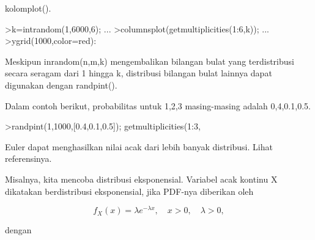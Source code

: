\documentclass[a4paper,10pt]{article}
\begin{document}
\begin{eulernotebook}
\begin{eulercomment}
\begin{eulercomment}
\begin{eulercomment}
\begin{eulercomment}
\begin{eulercomment}
\begin{eulercomment}
\begin{eulercomment}
\begin{eulercomment}
\begin{eulercomment}
\begin{eulercomment}
\begin{eulercomment}
\begin{eulercomment}
\begin{eulercomment}
\begin{eulercomment}
\begin{eulercomment}
\begin{eulercomment}
\begin{eulercomment}
\begin{eulercomment}
\begin{eulercomment}
\begin{eulercomment}
\begin{eulercomment}
\begin{eulercomment}
\begin{eulercomment}
\begin{eulercomment}
\begin{eulercomment}
\begin{eulercomment}
\begin{eulercomment}
\begin{eulercomment}
\begin{eulercomment}
\begin{eulercomment}
\begin{eulercomment}
\begin{eulercomment}
\begin{eulercomment}
\begin{eulercomment}
\begin{eulercomment}
\begin{eulercomment}
\begin{eulercomment}
\begin{eulercomment}
\begin{eulercomment}
\begin{eulercomment}
\begin{eulercomment}
\begin{eulercomment}
\begin{eulercomment}
\begin{eulercomment}
\begin{eulercomment}
\begin{eulercomment}
\begin{eulercomment}
\begin{eulercomment}
\begin{eulercomment}
\begin{eulercomment}
\begin{eulercomment}
\begin{eulercomment}
\begin{eulercomment}
\begin{eulercomment}
\begin{eulercomment}
\begin{eulercomment}
\begin{eulercomment}
\begin{eulercomment}
\begin{eulercomment}
\begin{eulercomment}
\begin{eulercomment}
\begin{eulercomment}
\begin{eulercomment}
\begin{eulercomment}
\begin{eulercomment}
\begin{eulercomment}
\begin{eulercomment}
kolomplot().
\end{eulercomment}
\begin{eulerprompt}
>k=intrandom(1,6000,6);  ...
>columnsplot(getmultiplicities(1:6,k));  ...
>ygrid(1000,color=red):
\end{eulerprompt}
\begin{eulercomment}
Meskipun inrandom(n,m,k) mengembalikan bilangan bulat yang
terdistribusi secara seragam dari 1 hingga k, distribusi bilangan
bulat lainnya dapat digunakan dengan randpint().

Dalam contoh berikut, probabilitas untuk 1,2,3 masing-masing adalah
0,4,0.1,0.5.
\end{eulercomment}
\begin{eulerprompt}
>randpint(1,1000,[0.4,0.1,0.5]); getmultiplicities(1:3,%
\end{eulerprompt}
\begin{euleroutput}
  [395,  106,  499]
\end{euleroutput}
\begin{eulercomment}
Euler dapat menghasilkan nilai acak dari lebih banyak distribusi.
Lihat referensinya.

Misalnya, kita mencoba distribusi eksponensial. Variabel acak kontinu
X dikatakan berdistribusi eksponensial, jika PDF-nya diberikan oleh\\
\end{eulercomment}
\begin{eulerformula}
\[
f_X(x)=\lambda e^{-\lambda x},\quad x>0,\quad \lambda>0,
\]
\end{eulerformula}
\begin{eulercomment}
dengan 
\end{eulercomment}
\end{eulercomment}
\end{eulercomment}
\end{eulercomment}
\end{eulercomment}
\end{eulercomment}
\end{eulercomment}
\end{eulercomment}
\end{eulercomment}
\end{eulercomment}
\end{eulercomment}
\end{eulercomment}
\end{eulercomment}
\end{eulercomment}
\end{eulercomment}
\end{eulercomment}
\end{eulercomment}
\end{eulercomment}
\end{eulercomment}
\end{eulercomment}
\end{eulercomment}
\end{eulercomment}
\end{eulercomment}
\end{eulercomment}
\end{eulercomment}
\end{eulercomment}
\end{eulercomment}
\end{eulercomment}
\end{eulercomment}
\end{eulercomment}
\end{eulercomment}
\end{eulercomment}
\end{eulercomment}
\end{eulercomment}
\end{eulercomment}
\end{eulercomment}
\end{eulercomment}
\end{eulercomment}
\end{eulercomment}
\end{eulercomment}
\end{eulercomment}
\end{eulercomment}
\end{eulercomment}
\end{eulercomment}
\end{eulercomment}
\end{eulercomment}
\end{eulercomment}
\end{eulercomment}
\end{eulercomment}
\end{eulercomment}
\end{eulercomment}
\end{eulercomment}
\end{eulercomment}
\end{eulercomment}
\end{eulercomment}
\end{eulercomment}
\end{eulercomment}
\end{eulercomment}
\end{eulercomment}
\end{eulercomment}
\end{eulercomment}
\end{eulercomment}
\end{eulercomment}
\end{eulercomment}
\end{eulercomment}
\end{eulercomment}
\end{eulercomment}
\end{eulernotebook}
\end{document}
